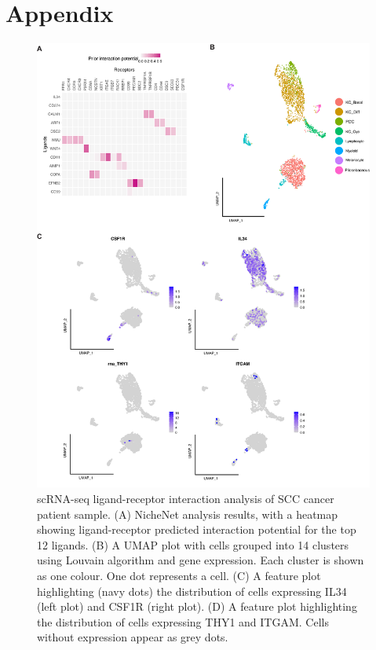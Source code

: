 \section{Appendix}
\begin{figure}[htp]
\renewcommand{\figurename}{Supplementary Figure}
    \centering
    \includegraphics[width=0.75\columnwidth]{Chapter2/Figures/Supplemental_Fig_S2.png}
    \caption[scRNA-seq ligand-receptor interaction analysis of SCC cancer patient sample. ]{scRNA-seq ligand-receptor interaction analysis of SCC cancer patient sample. (A) NicheNet analysis results, with a heatmap showing ligand-receptor predicted interaction potential for the top 12 ligands. (B) A UMAP plot with cells grouped into 14 clusters using Louvain algorithm and gene expression. Each cluster is shown as one colour. One dot represents a cell. (C) A feature plot highlighting (navy dots) the distribution of cells expressing IL34 (left plot) and CSF1R (right plot). (D) A feature plot highlighting the distribution of cells expressing THY1 and ITGAM. Cells without expression appear as grey dots.}
    \label{fig:Chap2_Supfigure2}
\end{figure}

